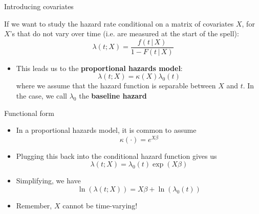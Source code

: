 \documentclass[english,xcolor=dvipsnames]{beamer}
\begin{document}
\begin{frame}{Introducing covariates}

If we want to study the hazard rate conditional on a matrix of covariates
$X$, for $X$'s that do not vary over time (i.e. are measured at
the start of the spell):
\[
\lambda\left(t;X\right)=\frac{f\left(t\,\vert\, X\right)}{1-F\left(t\,\vert\, X\right)}
\]

\begin{itemize}
\item This leads us to the \textbf{proportional hazards model}:
\[
\lambda\left(t;X\right)=\kappa\left(X\right)\lambda_{0}\left(t\right)
\]
where we assume that the hazard function is separable between $X$
and $t$. In the case, we call $\lambda_{0}$ the \textbf{baseline
hazard}
\end{itemize}

\end{frame}


\begin{frame}{Functional form}
\begin{itemize}
\item In a proportional hazards model, it is common to assume
\[
\kappa\left(\cdot\right)=e^{X\beta}
\]

\item Plugging this back into the conditional hazard function gives us
\begin{equation}
\lambda\left(t;X\right)=\lambda_{0}\left(t\right)\exp\left(X\beta\right)
\end{equation}

\item Simplifying, we have
\[
\ln\left(\lambda\left(t;X\right)\right)=X\beta+\ln\left(\lambda_{0}\left(t\right)\right)
\]

\item Remember, $X$ cannot be time-varying!
\end{itemize}

\end{frame}
\end{document}
